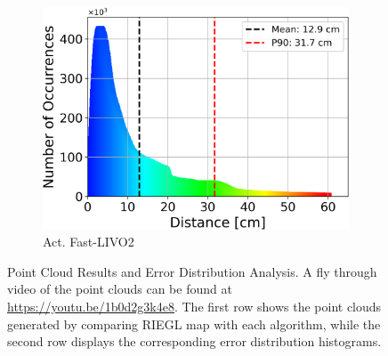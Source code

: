 \documentclass[conference]{IEEEtran}
\begin{document}
\begin{figure}[htbp]
\begin{subfigure}{0.18\textwidth}
    \centering
    \includegraphics[width=\textwidth]{pics/histogram_results/histogram_cond_actuated_livo.png}
    \caption{Act. Fast-LIVO2}
    \label{fig:hist_act_livo}
\end{subfigure}
\caption{Point Cloud Results and Error Distribution Analysis. A fly through video of the point clouds can be found at \url{https://youtu.be/1b0d2g3k4e8}. The first row shows the point clouds generated by comparing RIEGL map with each algorithm, while the second row displays the corresponding error distribution histograms.}
\label{fig:combined_results}
\end{figure}
\end{document}

